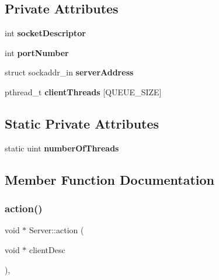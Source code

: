 \subsection*{Private Attributes}
\begin{DoxyCompactItemize}
\item 
\mbox{\label{classServer_a5e52b598760882795a7ea0aada7cb9b7}} 
int {\bfseries socket\+Descriptor}
\item 
\mbox{\label{classServer_a72256f23fe1dbb301a6a19e440f5d089}} 
int {\bfseries port\+Number}
\item 
\mbox{\label{classServer_a0a84291035718de02da7e2c4e661f2a1}} 
struct sockaddr\+\_\+in {\bfseries server\+Address}
\item 
\mbox{\label{classServer_a2659f052c537f44a27d2aef4ad079957}} 
pthread\+\_\+t {\bfseries client\+Threads} \mbox{[}Q\+U\+E\+U\+E\+\_\+\+S\+I\+ZE\mbox{]}
\end{DoxyCompactItemize}
\subsection*{Static Private Attributes}
\begin{DoxyCompactItemize}
\item 
\mbox{\label{classServer_ab11a1028476d4235bf3a2d8f468d2b81}} 
static uint {\bfseries number\+Of\+Threads}
\end{DoxyCompactItemize}


\subsection{Member Function Documentation}
\mbox{\label{classServer_a75b8fdcfd5e0438efe7bb79b317caa16}} 
\subsubsection{\texorpdfstring{action()}{action()}}
{\footnotesize\ttfamily void $\ast$ Server\+::action (\begin{DoxyParamCaption}\item[{void $\ast$}]{client\+Desc }\end{DoxyParamCaption})\hspace{0.3cm}{\ttfamily [static]}, {\ttfamily [private]}}




